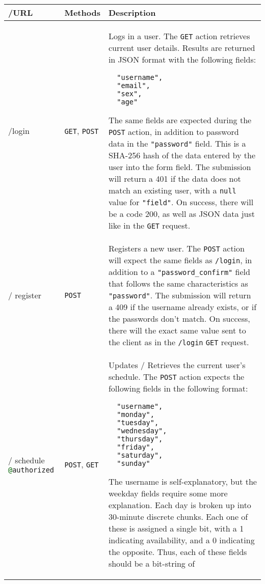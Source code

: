 \documentclass[fleqn,12pt]{article}
\makeatletter
\newcommand{\g}{\texttt{GET}}
\newcommand{\p}{\texttt{POST}}
\newcommand{\jsnull}{\texttt{null}}
\newcommand{\auth}{\texttt{\textcolor{darkgreen}{@}authorized}}
\makeatother
\begin{document}
\begin{longtable}{@{} >{\ttfamily/}p{1in} | p{0.8in} | p{4.27in}}
\hline
URL & Methods & Description \\
\hline
login & \g, \p &
Logs in a user.
\newline\newline
The \g{} action retrieves current user details. Results are returned in JSON
format with the following fields:
\begin{Verbatim}
  "username",
  "email",
  "sex",
  "age"
\end{Verbatim}
%
The same fields are expected during the \p{} action, in addition to password
data in the \texttt{"password"} field. This is a SHA-256 hash of the data
entered by the user into the form field.
\newline\newline
The submission will return a 401 if the data does not match an existing user,
with a \jsnull{} value for \texttt{"field"}. On success, there will be a code
200, as well as JSON data just like in the \g{} request.
\\
\hline
register & \p &
Registers a new user.
\newline\newline
The \p{} action will expect the same fields as \texttt{/login}, in addition to
a \texttt{"password\_confirm"} field that follows the same characteristics as
\texttt{"password"}.
\newline\newline
The submission will return a 409 if the username already exists, or if the
passwords don't match. On success, there will the exact same value sent to the
client as in the \texttt{/login} \g{} request.
\\
\hline
schedule \newline \auth & \p, \g &
Updates / Retrieves the current user's schedule.
\newline\newline
The \p{} action expects the following fields in the following format:
\begin{Verbatim}
  "username",
  "monday",
  "tuesday",
  "wednesday",
  "thursday",
  "friday",
  "saturday",
  "sunday"
\end{Verbatim}
%
The username is self-explanatory, but the weekday fields require some more
explanation. Each day is broken up into 30-minute discrete chunks. Each one of
these is assigned a single bit, with a 1 indicating availability, and a 0
indicating the opposite. Thus, each of these fields should be a bit-string of

\end{longtable}
\end{document}
